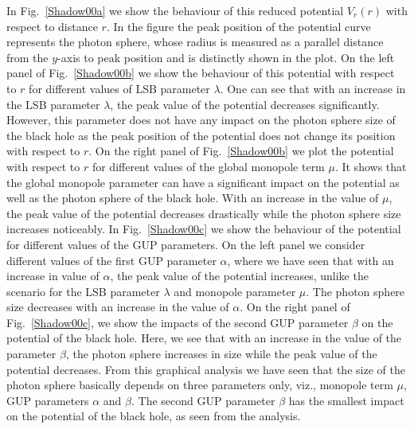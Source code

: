 \documentclass[aps,amsmath,amssymb,showpacs,showkeys]{revtex4}
\begin{document}
In Fig.\ \ref{Shadow00a} we show the behaviour of this reduced potential 
$V_r(r)$ with respect to distance $r$. In the figure the peak position of the 
potential curve represents the photon sphere, whose radius is measured as a
parallel distance from the $y$-axis to peak position and is distinctly shown 
in the plot. On the left panel of Fig.\ \ref{Shadow00b} we show the 
behaviour of this potential with respect to $r$ for different values of LSB 
parameter $\lambda$. One can see that with an increase in the LSB parameter 
$\lambda$, the peak value of the potential decreases significantly. However, 
this parameter does not have any impact on the photon sphere size of the black 
hole as the peak position of the potential does not change its position with
respect to $r$. On the right panel of Fig.\ \ref{Shadow00b} we plot 
the potential with respect to $r$ for different values of the global monopole 
term $\mu$. It shows that the global monopole parameter can have a significant 
impact on the potential as well as the photon sphere of the black hole. With 
an increase in the value of $\mu$, the peak value of the potential decreases 
drastically while the photon sphere size increases noticeably. In 
Fig.\ \ref{Shadow00c} we show the behaviour of the potential for 
different values of the GUP parameters. On the left panel we consider 
different values of the first GUP parameter $\alpha$, where we have seen that 
with an increase in value of $\alpha$, the peak value of the potential 
increases, unlike the scenario for the LSB parameter $\lambda$ and monopole 
parameter $\mu$. The photon sphere size decreases with an increase in the 
value of $\alpha$. On the right panel of Fig.\ \ref{Shadow00c}, we show 
the impacts of the second GUP parameter $\beta$ on the potential of the black 
hole. Here, we see that with an increase in the value of the parameter 
$\beta$, the photon sphere increases in size while the peak value of the 
potential decreases. 
From this graphical analysis we have seen that the size of the photon sphere 
basically depends on three parameters only, viz., monopole term $\mu$, GUP 
parameters $\alpha$ and $\beta$. The second GUP parameter $\beta$ has the 
smallest impact on the potential of the black hole, as seen from the analysis.
\end{document}
